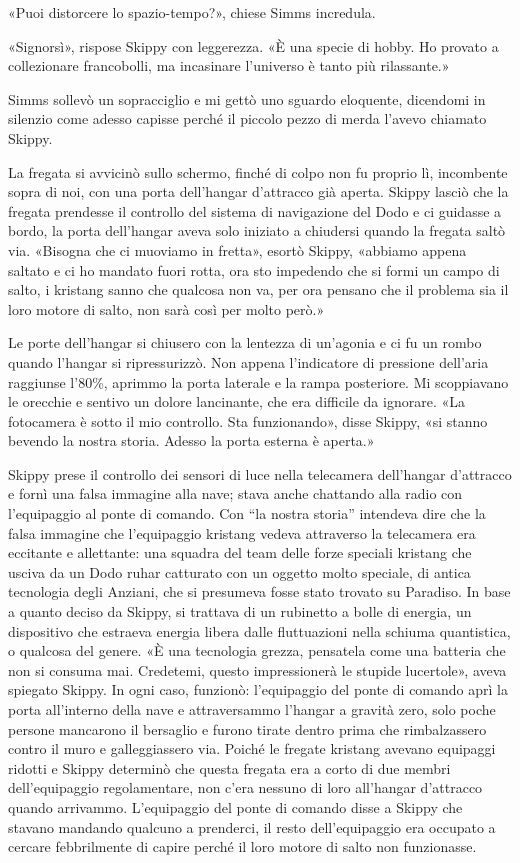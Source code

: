 «Puoi distorcere lo spazio-tempo?», chiese Simms incredula.

«Signorsì», rispose Skippy con leggerezza. «È una specie di hobby. Ho
provato a collezionare francobolli, ma incasinare l'universo è tanto più
rilassante.»

Simms sollevò un sopracciglio e mi gettò uno sguardo eloquente,
dicendomi in silenzio come adesso capisse perché il piccolo pezzo di
merda l'avevo chiamato Skippy.

\hfill\break

La fregata si avvicinò sullo schermo, finché di colpo non fu proprio lì,
incombente sopra di noi, con una porta dell'hangar d'attracco già
aperta. Skippy lasciò che la fregata prendesse il controllo del sistema
di navigazione del Dodo e ci guidasse a bordo, la porta dell'hangar
aveva solo iniziato a chiudersi quando la fregata saltò via. «Bisogna
che ci muoviamo in fretta», esortò Skippy, «abbiamo appena saltato e ci
ho mandato fuori rotta, ora sto impedendo che si formi un campo di
salto, i kristang sanno che qualcosa non va, per ora pensano che il
problema sia il loro motore di salto, non sarà così per molto però.»

Le porte dell'hangar si chiusero con la lentezza di un'agonia e ci fu un
rombo quando l'hangar si ripressurizzò. Non appena l'indicatore di
pressione dell'aria raggiunse l'80\%, aprimmo la porta laterale e la
rampa posteriore. Mi scoppiavano le orecchie e sentivo un dolore
lancinante, che era difficile da ignorare. «La fotocamera è sotto il mio
controllo. Sta funzionando», disse Skippy, «si stanno bevendo la nostra
storia. Adesso la porta esterna è aperta.»

Skippy prese il controllo dei sensori di luce nella telecamera
dell'hangar d'attracco e fornì una falsa immagine alla nave; stava anche
chattando alla radio con l'equipaggio al ponte di comando. Con ``la
nostra storia'' intendeva dire che la falsa immagine che l'equipaggio
kristang vedeva attraverso la telecamera era eccitante e allettante: una
squadra del team delle forze speciali kristang che usciva da un Dodo
ruhar catturato con un oggetto molto speciale, di antica tecnologia
degli Anziani, che si presumeva fosse stato trovato su Paradiso. In base
a quanto deciso da Skippy, si trattava di un rubinetto a bolle di
energia, un dispositivo che estraeva energia libera dalle fluttuazioni
nella schiuma quantistica, o qualcosa del genere. «È una tecnologia
grezza, pensatela come una batteria che non si consuma mai. Credetemi,
questo impressionerà le stupide lucertole», aveva spiegato Skippy. In
ogni caso, funzionò: l'equipaggio del ponte di comando aprì la porta
all'interno della nave e attraversammo l'hangar a gravità zero, solo
poche persone mancarono il bersaglio e furono tirate dentro prima che
rimbalzassero contro il muro e galleggiassero via. Poiché le fregate
kristang avevano equipaggi ridotti e Skippy determinò che questa fregata
era a corto di due membri dell'equipaggio regolamentare, non c'era
nessuno di loro all'hangar d'attracco quando arrivammo. L'equipaggio del
ponte di comando disse a Skippy che stavano mandando qualcuno a
prenderci, il resto dell'equipaggio era occupato a cercare febbrilmente
di capire perché il loro motore di salto non funzionasse.


